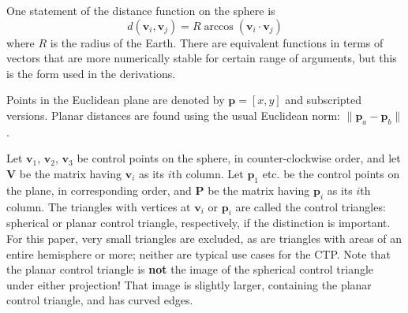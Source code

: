 \documentclass[]{interact}
\begin{document}
One statement of the distance function on the sphere is
\begin{equation}
d\left(\mathbf v_i, \mathbf v_j\right)
= R \arccos\left(\mathbf v_i \cdot \mathbf v_j\right)
\end{equation}
where $R$ is the radius of the Earth. There are equivalent functions in terms
of vectors that are more numerically stable for certain range of arguments,
but this is the form used in the derivations.

Points in the Euclidean plane are denoted by $\mathbf p = [x, y]$ and
subscripted versions. Planar distances are found using the usual
Euclidean norm: $\|\mathbf p_a - \mathbf p_b\|$.

Let $\mathbf v_1$, $\mathbf v_2$, $\mathbf v_3$ be control points on the
sphere, in counter-clockwise order, and let $\mathbf V$ be the matrix having
$\mathbf v_i$ as its $i$th column. Let $\mathbf p_1$ etc. be the control points
on the plane, in corresponding order, and $\mathbf P$ be the matrix having
$\mathbf p_i$ as its $i$th column. The triangles with vertices at $\mathbf v_i$
or $\mathbf p_i$ are called the control triangles: spherical or planar control
triangle, respectively, if the distinction is important. For this paper,
very small triangles are excluded, as are triangles with areas of an entire
hemisphere or more; neither are typical use cases for the CTP.
Note that the planar control triangle is \textbf{not} the image of the
spherical control triangle under either projection! That image is
slightly larger, containing the planar control triangle, and has curved edges.
\end{document}
